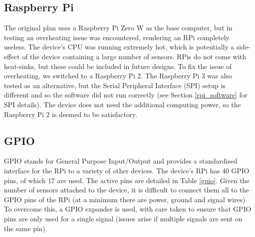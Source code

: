 \documentclass[11pt]{report}
\begin{document}

\subsection{Raspberry Pi}

The original plan uses a Raspberry Pi Zero W as the base computer, but in testing an overheating issue was encountered, rendering an RPi completely useless. The device's CPU was running extremely hot, which is potentially a side-effect of the device containing a large number of sensors. RPis do not come with heat-sinks, but these could be included in future designs. To fix the issue of overheating, we switched to a Raspberry Pi 2. The Raspberry Pi 3 was also tested as an alternative, but the Serial Peripheral Interface (SPI) setup is different and so the software did not run correctly (see Section \ref{rpi_software} for SPI details). The device does not need the additional computing power, so the Raspberry Pi 2 is deemed to be satisfactory.

\subsection{GPIO}

GPIO stands for General Purpose Input/Output and provides a standardised interface for the RPi to a variety of other devices. The device's RPi has 40 GPIO pins, of which 17 are used. The active pins are detailed in Table \ref{gpio}. Given the number of sensors attached to the device, it is difficult to connect them all to the GPIO pins of the RPi (at a minimum there are power, ground and signal wires). To overcome this, a GPIO expander is used, with care taken to ensure that GPIO pins are only used for a single signal (issues arise if multiple signals are sent on the same pin). 
\end{document}
